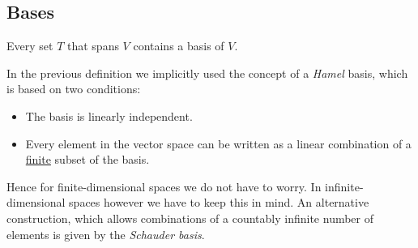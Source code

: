 \subsection{Bases}
	
	\begin{result}
		Every set $T$ that spans $V$ contains a basis of $V$.
	\end{result}
	
	\begin{remark}
		In the previous definition we implicitly used the concept of a \textit{Hamel} basis, which is based on two conditions:
		\begin{itemize}
			\item The basis is linearly independent.
			\item Every element in the vector space can be written as a linear combination of a \underline{finite} subset of the basis.
		\end{itemize}
		Hence for finite-dimensional spaces we do not have to worry. In infinite-dimensional spaces however we have to keep this in mind. An alternative construction, which allows combinations of a countably infinite number of elements is given by the \textit{Schauder basis}.
	\end{remark}
	
